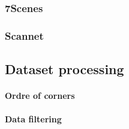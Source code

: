 \subsubsection{7Scenes}

\subsubsection{Scannet}


\subsection{Dataset processing}

\paragraph{Ordre of corners}
\paragraph{Data filtering}

